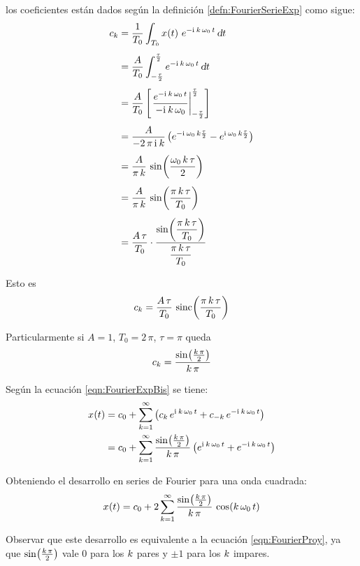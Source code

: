 \documentclass[a5paper,12pt,twoside]{book}
\begin{document}
\begin{mdframed}[style=MyFrame2]
    los coeficientes están dados según la definición \ref{defn:FourierSerieExp} como sigue:
    \begin{align*}
        c_\kth &= \frac{1}{T_0} \int_{T_0} \fx[x]{t} \, e^{-\iu \, \kth \, \omega_0 \, t} \, \dif t
        \\[1ex]
        &= \frac{A}{T_0} \int_{-\frac{\tau}{2}}^{\frac{\tau}{2}} e^{-\iu \, \kth \, \omega_0 \, t} \, \dif t
        \\[1ex]
        &= \frac{A}{T_0} \barrow{\dfrac{e^{-\iu \, \kth \, \omega_0 \, t}}{-\iu \, \kth \, \omega_0}}{-\frac{\tau}{2}}{\frac{\tau}{2}}
        \\[1ex]
        &= \frac{A}{-2 \, \pi \, \iu \, \kth } \bb{ e^{ -\iu \, \omega_0 \, \kth \frac{\tau}{2}} - e^{ \iu \, \omega_0 \, \kth \frac{\tau}{2}} }
        \\[1ex]
        &= \frac{A}{\pi \, \kth} \, \fx[\sin]{\frac{\omega_0 \, \kth \, \tau}{2}}
        \\[1ex]
        &= \frac{A}{\pi \, \kth} \, \fx[\sin]{\frac{\pi \, \kth \, \tau}{T_0}}
        \\[1ex]
        &= \frac{A \, \tau}{T_0} \cdot
        \frac{ \fx[\sin]{\dfrac{\pi \, \kth \, \tau}{T_0}} }{ \dfrac{\pi \, \kth \, \tau}{T_0} }
    \end{align*}

    Esto es
    \begin{equation*}
        c_\kth = \frac{A \, \tau}{T_0} \, \fx[\sinc]{\frac{\pi \, \kth \, \tau}{T_0}}
    \end{equation*}

    Particularmente si $A=1$, $T_0=2\,\pi$, $\tau=\pi$ queda
    \begin{equation*}
        c_\kth = \frac{ \fx[\sin]{\frac{\kth \, \pi}{2}} }{\kth \, \pi}
    \end{equation*}

    Según la ecuación \ref{eqn:FourierExpBis} se tiene:
    \begin{align*}
        \fx[x]{t} &= c_0 + \sum_{\kth=1}^{\infty} \bb{ c_\kth \, e^{\iu \, \kth \, \omega_0 \, t} + c_{-\kth} \, e^{-\iu \, \kth \, \omega_0 \, t} }
        \\
        &= c_0 + \sum_{\kth=1}^{\infty} \frac{\fx[\sin]{\frac{\kth \, \pi}{2}}}{\kth \, \pi} \bb{ e^{\iu \, \kth \, \omega_0 \, t} + e^{-\iu \, \kth \, \omega_0 \, t} }
    \end{align*}

    Obteniendo el desarrollo en series de Fourier para una onda cuadrada:
    \begin{equation*}
        \fx[x]{t} = c_0 + 2 \sum_{\kth=1}^{\infty} \frac{\fx[\sin]{\frac{\kth \, \pi}{2}}}{\kth \, \pi} \, \fx[\cos]{\kth \, \omega_0 \, t}
    \end{equation*}

    Observar que este desarrollo es equivalente a la ecuación \ref{eqn:FourierProy}, ya que $\fx[\sin]{\frac{\kth \, \pi}{2}}$ vale 0 para los $\kth$ pares y $\pm1$ para los $\kth$ impares.
\end{mdframed}
\end{document}
